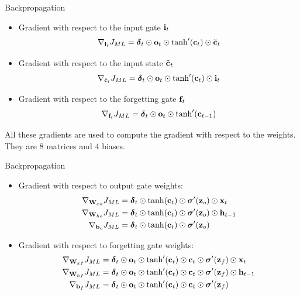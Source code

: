 \documentclass{beamer}
\begin{document}
\begin{frame}{Backpropagation}

\begin{itemize}
    \item Gradient with respect to the input gate ${\bf i}_t$
    \begin{equation}
        \nabla_{{\bf i}_t} J_{ML} = {\boldsymbol \delta}_t \odot {{\bf o}_t} \odot \tanh'({\bf c}_t) \odot {\tilde {{\bf c}}_t}
    \end{equation}
    \item Gradient with respect to the input state $\tilde{{\bf c}}_t$
    \begin{equation}
             \nabla_{\tilde{{\bf c}}_t} J_{ML} =  {\boldsymbol \delta}_t \odot {{\bf o}_t} \odot \tanh'({\bf c}_t) \odot {{\bf i}}_t
    \end{equation}
    \item Gradient with respect to the forgetting gate ${\bf f}_t$
    \begin{equation}
         \nabla_{{\bf f}_t} J_{ML} = {\boldsymbol \delta}_t \odot {{\bf o}_t} \odot \tanh'({\bf c}_{t-1})
    \end{equation}
\end{itemize}

All these gradients are used to compute the gradient with respect to the weights. They are 8 matrices and 4 biases. 
\end{frame}
\begin{frame}{Backpropagation}
\begin{itemize}
    \item Gradient with respect to output gate weights:
    \begin{equation}
    \begin{split}        
    \nabla_{{\bf W}_{xo}} J_{ML}  &=  {\boldsymbol \delta}_t \odot  \tanh({\bf c}_t) \odot {\boldsymbol \sigma}'({\bf z}_o)\odot {\bf x}_t\\
    \nabla_{{\bf W}_{ho}} J_{ML}  &=  {\boldsymbol \delta}_t \odot  \tanh({\bf c}_t) \odot {\boldsymbol \sigma}'({\bf z}_o)\odot {\bf h}_{t-1}\\
   \nabla_{{\bf b}_{o}}  J_{ML} &=  {\boldsymbol \delta}_t \odot  \tanh({\bf c}_t) \odot {\boldsymbol \sigma}'({\bf z}_o) \\
    \end{split}
    \end{equation}

\item Gradient with respect to forgetting gate weights:
    \begin{equation}
    \begin{split}        
    \nabla_{{\bf W}_{xf}} J_{ML}  &=  {\boldsymbol \delta}_t \odot {\bf o}_t \odot \tanh'({\bf c}_t) \odot {\bf c}_t \odot {\boldsymbol \sigma}'({\bf z}_f)\odot {\bf x}_t\\
    \nabla_{{\bf W}_{hf}}  J_{ML} &=  {\boldsymbol \delta}_t \odot  {\bf o}_t \odot \tanh'({\bf c}_t) \odot {\bf c}_t \odot {\boldsymbol \sigma}'({\bf z}_f)\odot {\bf h}_{t-1}\\
   \nabla_{{\bf b}_{f}} J_{ML}  &=  {\boldsymbol \delta}_t \odot  {\bf o}_t \odot \tanh'({\bf c}_t) \odot {\bf c}_t \odot {\boldsymbol \sigma}'({\bf z}_f) \\
    \end{split}
    \end{equation}


\end{itemize}
\end{frame}
\end{document}
